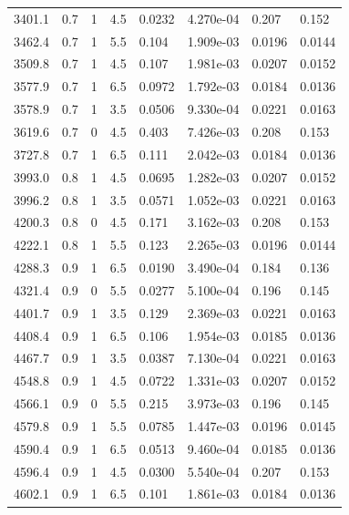 \documentclass[preview]{standalone}
\begin{document}
{{{\begin{tabular}{L{1.2cm}C{1.2cm} C{0.3cm}C{0.5cm} C{1.4cm}C{1.4cm} C{1.4cm}C{1.4cm}}
  3401.1  &   0.7  & 1     & 4.5 &  0.0232  & 4.270e-04  & 0.207 &  0.152   \\ 
  3462.4  &   0.7  & 1     & 5.5 &  0.104  & 1.909e-03  & 0.0196 &  0.0144   \\ 
  3509.8  &   0.7  & 1     & 4.5 &  0.107  & 1.981e-03  & 0.0207 &  0.0152   \\ 
  3577.9  &   0.7  & 1     & 6.5 &  0.0972  & 1.792e-03  & 0.0184 &  0.0136   \\ 
  3578.9  &   0.7  & 1     & 3.5 &  0.0506  & 9.330e-04  & 0.0221 &  0.0163   \\ 
  3619.6  &   0.7  & 0     & 4.5 &  0.403  & 7.426e-03  & 0.208 &  0.153   \\ 
  3727.8  &   0.7  & 1     & 6.5 &  0.111  & 2.042e-03  & 0.0184 &  0.0136   \\ 
  3993.0  &   0.8  & 1     & 4.5 &  0.0695  & 1.282e-03  & 0.0207 &  0.0152   \\ 
  3996.2  &   0.8  & 1     & 3.5 &  0.0571  & 1.052e-03  & 0.0221 &  0.0163   \\ 
  4200.3  &   0.8  & 0     & 4.5 &  0.171  & 3.162e-03  & 0.208 &  0.153   \\ 
  4222.1  &   0.8  & 1     & 5.5 &  0.123  & 2.265e-03  & 0.0196 &  0.0144   \\ 
  4288.3  &   0.9  & 1     & 6.5 &  0.0190  & 3.490e-04  & 0.184 &  0.136   \\ 
  4321.4  &   0.9  & 0     & 5.5 &  0.0277  & 5.100e-04  & 0.196 &  0.145   \\ 
  4401.7  &   0.9  & 1     & 3.5 &  0.129  & 2.369e-03  & 0.0221 &  0.0163   \\ 
  4408.4  &   0.9  & 1     & 6.5 &  0.106  & 1.954e-03  & 0.0185 &  0.0136   \\ 
  4467.7  &   0.9  & 1     & 3.5 &  0.0387  & 7.130e-04  & 0.0221 &  0.0163   \\ 
  4548.8  &   0.9  & 1     & 4.5 &  0.0722  & 1.331e-03  & 0.0207 &  0.0152   \\ 
  4566.1  &   0.9  & 0     & 5.5 &  0.215  & 3.973e-03  & 0.196 &  0.145   \\ 
  4579.8  &   0.9  & 1     & 5.5 &  0.0785  & 1.447e-03  & 0.0196 &  0.0145   \\ 
  4590.4  &   0.9  & 1     & 6.5 &  0.0513  & 9.460e-04  & 0.0185 &  0.0136   \\ 
  4596.4  &   0.9  & 1     & 4.5 &  0.0300  & 5.540e-04  & 0.207 &  0.153   \\ 
  4602.1  &   0.9  & 1     & 6.5 &  0.101  & 1.861e-03  & 0.0184 &  0.0136   \\ 

\end{tabular}}}}
\end{document}
